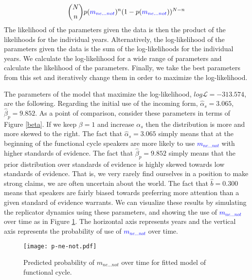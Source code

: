 \documentclass[linguex]{sp}
\theoremstyle{definition} \newtheorem{definition}{Definition}
\begin{document}
\begin{equation} 
\binom{N}{n} p(\textcolor{blue}{m_{ne...not}})^{n}(1-p(\textcolor{blue}{m_{ne...not}}))^{N - n}
\end{equation}
The likelihood of the parameters given the data is then the product of the likelihoods for the individual years. Alternatively, the log-likelihood of the parameters given the data is the sum of the log-likelihoods for the individual years. We calculate the log-likelihood for a wide range of parameters and calculate the likelihood of the parameters. Finally, we take the best parameters from this set and iteratively change them in order to maximize the log-likelihood.

The parameters of the model that maximize the log-likelihood, $log\mathcal{L} = -313.574$, are the following.  Regarding the initial use of the incoming form, $\hat{\alpha}_{s} = 3.065$, $\hat{\beta}_p =  9.852$. As a point of comparison, consider these parameters in terms of Figure \ref{beta}. If we keep $\beta=1$ and increase $\alpha_s$ then the distribution is more and more skewed to the right. The fact that $\hat{\alpha}_{s} = 3.065$ simply means that at the beginning of the functional cycle speakers are more likely to use \textcolor{blue}{$m_{ne...not}$} with higher standards of evidence. The fact that $\hat{\beta}_p =  9.852$ simply means that the prior distribution over standards of evidence is highly skewed towards low standards of evidence. That is, we very rarely find ourselves in a position to make strong claims, we are often uncertain about the world. The fact that $\hat{b}=0.300$ means that speakers are fairly biased towards preferring more attention than a given standard of evidence warrants. We can visualize these results by simulating the replicator dynamics using these parameters, and showing the use of \textcolor{blue}{$m_{ne...not}$} over time as in Figure \ref{m2-sol}. The horizontal axis represents years and the vertical axis represents the probability of use of \textcolor{blue}{$m_{ne...not}$} over time.  

\begin{figure}
\centering
     \texttt{[image: p-ne-not.pdf]}
\caption{Predicted probability of \textit{\color{blue} $m_{ne...not}$} over time for fitted model of functional cycle.}
\label{m2-sol}
\end{figure}
\end{document}
